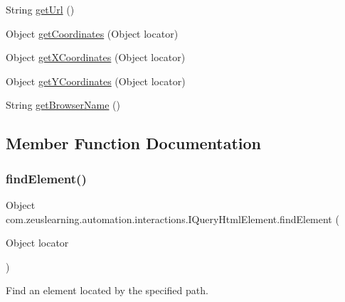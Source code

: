 \begin{DoxyCompactItemize}
\item 
String \hyperlink{interfacecom_1_1zeuslearning_1_1automation_1_1interactions_1_1IQueryHtmlElement_a78298d723dbd0b7bef6098971596b78f}{get\+Url} ()
\item 
Object \hyperlink{interfacecom_1_1zeuslearning_1_1automation_1_1interactions_1_1IQueryHtmlElement_a7e632b8b3ccb6f9446e65dcf961d5d9a}{get\+Coordinates} (Object locator)
\item 
Object \hyperlink{interfacecom_1_1zeuslearning_1_1automation_1_1interactions_1_1IQueryHtmlElement_a5c04301a20d28108814175e83ea6e939}{get\+X\+Coordinates} (Object locator)
\item 
Object \hyperlink{interfacecom_1_1zeuslearning_1_1automation_1_1interactions_1_1IQueryHtmlElement_a7fa59044cee483ac710d06186d46776c}{get\+Y\+Coordinates} (Object locator)
\item 
String \hyperlink{interfacecom_1_1zeuslearning_1_1automation_1_1interactions_1_1IQueryHtmlElement_a4ec7d7e9291f5dfe81fdbb93217af747}{get\+Browser\+Name} ()
\end{DoxyCompactItemize}


\subsection{Member Function Documentation}
\hypertarget{interfacecom_1_1zeuslearning_1_1automation_1_1interactions_1_1IQueryHtmlElement_a78f486627e6d51d93e2cada41fdf8c0d}{}\label{interfacecom_1_1zeuslearning_1_1automation_1_1interactions_1_1IQueryHtmlElement_a78f486627e6d51d93e2cada41fdf8c0d} 
\subsubsection{\texorpdfstring{find\+Element()}{findElement()}}
{\footnotesize\ttfamily Object com.\+zeuslearning.\+automation.\+interactions.\+I\+Query\+Html\+Element.\+find\+Element (\begin{DoxyParamCaption}\item[{Object}]{locator }\end{DoxyParamCaption})}

Find an element located by the specified path.



